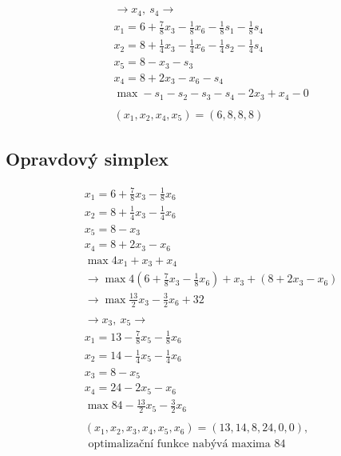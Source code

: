\documentclass[a4paper]{article}
\begin{document}
\begin{align*}
& \\
& \rightarrow x_4,\ s_4 \rightarrow \\
& x_1 = 6 + \frac{7}{8} x_3 - \frac{1}{8} x_6- \frac{1}{8}s_1  -\frac{1}{8} s_4  \\
& x_2 = 8 + \frac{1}{4} x_3 - \frac{1}{4} x_6 - \frac{1}{4}s_2 - \frac{1}{4} s_4 \\
& x_5 = 8 - x_3 - s_3 \\
& x_4 = 8 + 2x_3 - x_6 - s_4 \\
& \max -s_1 - s_2 - s_3 - s_4 - 2x_3 +x_4 -0 \\
& \\
& (x_1, x_2, x_4, x_5) = (6, 8, 8, 8)
\end{align*}

\pagebreak

\subsection*{Opravdový simplex}

\begin{align*}
& x_1 = 6 + \frac{7}{8} x_3 - \frac{1}{8} x_6\\
& x_2 = 8 + \frac{1}{4} x_3 - \frac{1}{4} x_6\\
& x_5 = 8 - x_3 \\
& x_4 = 8 + 2x_3 - x_6 \\
& \max 4x_1 + x_3 + x_4 \\
& \rightarrow \max 4(6 + \frac{7}{8} x_3 - \frac{1}{8} x_6) + x_3 + (8 + 2x_3 - x_6 ) \\
& \rightarrow \max \frac{13}{2} x_3 - \frac{3}{2} x_6 + 32\\
& \\
& \rightarrow x_3,\ x_5 \rightarrow \\
& x_1 = 13 - \frac{7}{8} x_5 - \frac{1}{8} x_6 \\
& x_2 = 14 -\frac{1}{4} x_5 - \frac{1}{4} x_6\\
& x_3 = 8 - x_5 \\
& x_4 = 24 -2x_5 - x_6 \\
& \max 84 -\frac{13}{2} x_5 - \frac{3}{2} x_6 \\
& \\
& (x_1, x_2, x_3, x_4, x_5, x_6) = (13, 14, 8, 24, 0, 0),\\
& \text{ optimalizační funkce nabývá maxima } 84
\end{align*}
\end{document}
